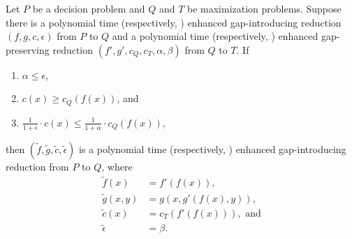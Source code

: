 \documentclass[]{article}
\begin{document}
\begin{lemma}\label{lem:compose}
  Let $P$ be a decision problem and $Q$ and $T$ be maximization problems.
  Suppose there is a polynomial time (respectively, \NC) enhanced gap-introducing reduction $(f, g, c, \epsilon)$ from $P$ to $Q$ and a polynomial time (respectively, \NC) enhanced gap-preserving reduction $(f', g', c_Q, c_T, \alpha, \beta)$ from $Q$ to $T$.
  If
  \begin{enumerate}
  \item $\alpha \leq \epsilon$,
  \item $c(x) \geq c_Q(f(x))$, and
  \item $\frac{1}{1 + \epsilon} \cdot c(x) \leq \frac{1}{1 + \alpha} \cdot c_Q(f(x))$,
  \end{enumerate}
  then $(\tilde{f}, \tilde{g}, \tilde{c}, \tilde{\epsilon})$ is a polynomial time (respectively, \NC) enhanced gap-introducing reduction from $P$ to $Q$, where
  \begin{align*}
    \tilde{f}(x) & = f'(f(x)), \\
    \tilde{g}(x, y) & = g(x, g'(f(x), y)), \\
    \tilde{c}(x) & = c_T(f'(f(x))), \text{ and} \\
    \tilde{\epsilon} & = \beta.
  \end{align*}
\end{lemma}
\end{document}
